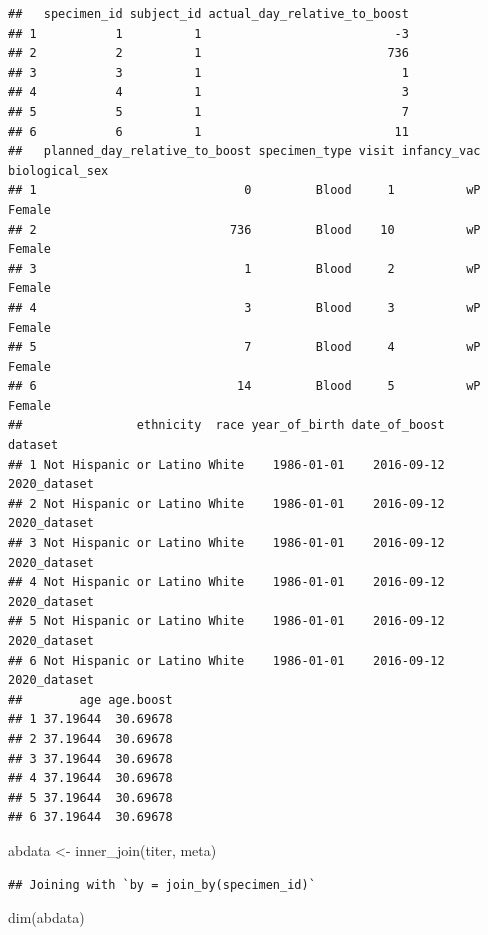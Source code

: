 \documentclass[
]{article}
\newenvironment{Shaded}{\begin{snugshade}}{\end{snugshade}}
\newcommand{\FunctionTok}[1]{\textcolor[rgb]{0.00,0.00,0.00}{#1}}
\newcommand{\NormalTok}[1]{#1}
\newcommand{\OtherTok}[1]{\textcolor[rgb]{0.56,0.35,0.01}{#1}}
\begin{document}
\begin{verbatim}
##   specimen_id subject_id actual_day_relative_to_boost
## 1           1          1                           -3
## 2           2          1                          736
## 3           3          1                            1
## 4           4          1                            3
## 5           5          1                            7
## 6           6          1                           11
##   planned_day_relative_to_boost specimen_type visit infancy_vac biological_sex
## 1                             0         Blood     1          wP         Female
## 2                           736         Blood    10          wP         Female
## 3                             1         Blood     2          wP         Female
## 4                             3         Blood     3          wP         Female
## 5                             7         Blood     4          wP         Female
## 6                            14         Blood     5          wP         Female
##                ethnicity  race year_of_birth date_of_boost      dataset
## 1 Not Hispanic or Latino White    1986-01-01    2016-09-12 2020_dataset
## 2 Not Hispanic or Latino White    1986-01-01    2016-09-12 2020_dataset
## 3 Not Hispanic or Latino White    1986-01-01    2016-09-12 2020_dataset
## 4 Not Hispanic or Latino White    1986-01-01    2016-09-12 2020_dataset
## 5 Not Hispanic or Latino White    1986-01-01    2016-09-12 2020_dataset
## 6 Not Hispanic or Latino White    1986-01-01    2016-09-12 2020_dataset
##        age age.boost
## 1 37.19644  30.69678
## 2 37.19644  30.69678
## 3 37.19644  30.69678
## 4 37.19644  30.69678
## 5 37.19644  30.69678
## 6 37.19644  30.69678
\end{verbatim}

\begin{Shaded}
\begin{Highlighting}[]
\NormalTok{abdata }\OtherTok{\textless{}{-}} \FunctionTok{inner\_join}\NormalTok{(titer, meta)}
\end{Highlighting}
\end{Shaded}

\begin{verbatim}
## Joining with `by = join_by(specimen_id)`
\end{verbatim}

\begin{Shaded}
\begin{Highlighting}[]
\FunctionTok{dim}\NormalTok{(abdata)}
\end{Highlighting}
\end{Shaded}
\end{document}
